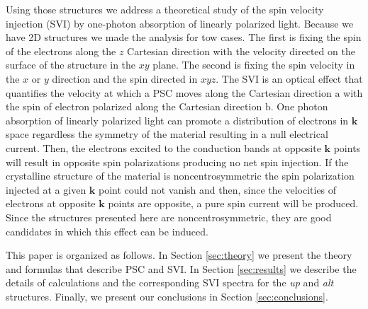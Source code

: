 \documentclass[prb,11pt,tightenlines,twocolumn,aps]{revtex4-1}
\begin{document}
Using those structures we address a theoretical study of the spin velocity
injection (SVI) by one-photon absorption of linearly polarized light.
% 
{
% 
Because we have 2D structures we made the analysis for tow cases. The first is
fixing the spin of the electrons along the $z$ Cartesian direction with the
velocity directed on the surface of the structure in the $xy$ plane. The second
is fixing the spin velocity in the $x$ or $y$ direction and the spin directed
in $xyz$.}
% 
The SVI is an optical effect that quantifies the velocity at which a PSC moves
along the Cartesian direction $\mathrm{a}$ with the spin of electron polarized
along the Cartesian direction $\mathrm{b}$. One photon absorption of linearly
polarized light can promote a distribution of electrons in $\mathbf{k}$ space
regardless the symmetry of the material resulting in a null electrical current.
Then, the electrons excited to the conduction bands at opposite $\mathbf{k}$
points will result in opposite spin polarizations producing no net spin
injection.\cite{bhatPRL05} If the crystalline structure of the material is
noncentrosymmetric the spin polarization injected at a given $\mathbf{k}$ point
could not vanish\cite{alvaradoPRL85, schmiedeskampPRL88} 
% 
{
% 
and then, since the velocities of electrons at opposite $\mathbf{k}$ points are
opposite, a pure spin current will be produced. Since the structures presented
here are noncentrosymmetric, they are good candidates in which this effect can
be induced.}

This paper is organized as follows. In Section \ref{sec:theory} we present the
theory and formulas that describe PSC and SVI. In Section \ref{sec:results} we
describe the details of calculations and the corresponding SVI spectra for the
\emph{up} and \emph{alt} structures. Finally, we present our conclusions in
Section \ref{sec:conclusions}.


\end{document}
